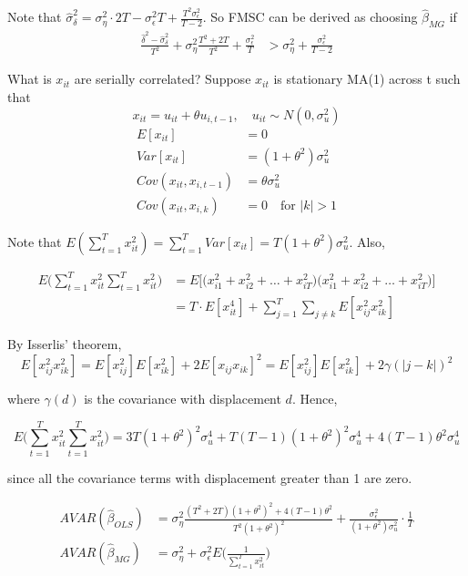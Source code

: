 Note that $\widehat{\sigma}_\delta^2 = \sigma_\eta^2 \cdot 2T - \sigma_\epsilon^2 T + \frac{T^2 \sigma_\epsilon^2}{T-2}$. So FMSC can be derived as choosing $\widehat{\beta}_{MG}$ if
\begin{align*}
\frac{\widehat{\delta}^2 - \widehat{\sigma}_\delta^2}{T^2} + \sigma_\eta^2\frac{T^2+2T}{T^2} + \frac{\sigma_\epsilon^2}{T} &> \sigma_\eta^2 + \frac{\sigma_\epsilon^2}{T-2}
\end{align*}
\vspace{0.2in}

What is $x_{it}$ are serially correlated? Suppose $x_{it}$ is stationary MA(1) across t such that
\[
x_{it} = u_{it} + \theta u_{i,t-1}, \quad u_{it} \sim N(0, \sigma_u^2)
\]
\begin{align*}
E[x_{it}] &= 0\\
 Var[x_{it}] &= (1+\theta^2)\sigma_u^2\\
Cov(x_{it}, x_{i,t-1}) & = \theta \sigma_u^2\\
Cov(x_{it}, x_{i,k}) & = 0 \quad \text{for $|k|>1$}
\end{align*}

Note that $E(\sum_{t=1}^T x_{it}^2) = \sum_{t=1}^T Var[x_{it}] = T (1+\theta^2) \sigma_u^2$. Also,

\begin{align*}
E\big( \sum_{t=1}^T x_{it}^2 \sum_{t=1}^T x_{it}^2\big) & = E\bigg[\big(x_{i1}^2 + x_{i2}^2 + \hdots + x_{iT}^2 \big) \big(x_{i1}^2 + x_{i2}^2 + \hdots + x_{iT}^2 \big)     \bigg]\\
& = T \cdot E[x_{it}^4] + \sum_{j=1}^T\sum_{j\neq k} E[x_{ij}^2x_{ik}^2]
\end{align*}

By Isserlis' theorem,
\[
E[x_{ij}^2 x_{ik}^2] = E[x_{ij}^2]E[x_{ik}^2] + 2E[x_{ij}x_{ik}]^2 = E[x_{ij}^2]E[x_{ik}^2] + 2 \gamma(|j-k|)^2
\]

where $\gamma(d)$ is the covariance with displacement $d$. Hence,

\[
E\big( \sum_{t=1}^T x_{it}^2 \sum_{t=1}^T x_{it}^2\big) = 3T (1+\theta^2)^2\sigma_u^4 + T(T-1)(1+\theta^2)^2\sigma_u^4 + 4(T-1)\theta^2\sigma_u^4
\]

since all the covariance terms with displacement greater than 1 are zero. 

\begin{align*}
AVAR(\widehat{\beta}_{OLS}) &= \sigma_\eta^2 \frac{(T^2+2T)(1+\theta^2)^2 + 4(T-1)\theta^2}{T^2(1+\theta^2)^2} + \frac{\sigma_\epsilon^2}{(1+\theta^2)\sigma_u^2} \cdot \frac{1}{T}\\
AVAR(\widehat{\beta}_{MG}) &= \sigma_\eta^2 + \sigma_\epsilon^2 E\bigg( \frac{1}{\sum_{t=1}^T x_{it}^2}\bigg)
\end{align*}


